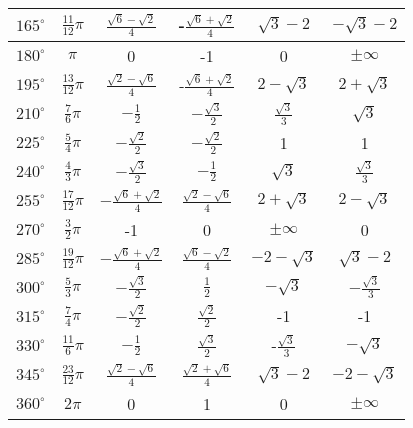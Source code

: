 \begin{tabular}{  | c | c || c | c | c | c | }
  	\hline	
    $165^{\circ}$     & $\frac{11}{12}\pi$   & $\frac{\sqrt{6}-\sqrt{2}}{4}$       &  -$\frac{\sqrt{6}+\sqrt{2}}{4}$     & $\sqrt{3}-2$   & $-\sqrt{3}-2$       \\
    \hline
    $180^{\circ}$     & $\pi$     & 0   &   -1   &  0    &  $\pm\infty$  \\
    \hline
	$195^{\circ}$     & $\frac{13}{12}\pi$   & $\frac{\sqrt{2}-\sqrt{6}}{4}$       &  -$\frac{\sqrt{6}+\sqrt{2}}{4}$     & $2-\sqrt{3}$   & $2+\sqrt{3}$       \\
	\hline
	$210^{\circ}$     & $\frac{7}{6}\pi$     & $-\frac{1}{2}$      &   $-\frac{\sqrt{3}}{2}$     &  $\frac{\sqrt{3}}{3}$    &  $\sqrt{3}$  \\
	\hline
  	$225^{\circ}$     & $\frac{5}{4}\pi$     & $-\frac{\sqrt{2}}{2}$      &   $-\frac{\sqrt{2}}{2}$     &  1    &  1  \\
  	\hline	
  	$240^{\circ}$     & $\frac{4}{3}\pi$     & $-\frac{\sqrt{3}}{2}$      &   $-\frac{1}{2}$     &  $\sqrt{3}$    &  $\frac{\sqrt{3}}{3}$  \\
  	\hline
     $255^{\circ}$     & $\frac{17}{12}\pi$   & $-\frac{\sqrt{6}+\sqrt{2}}{4}$       &  $\frac{\sqrt{2}-\sqrt{6}}{4}$     & $2+\sqrt{3}$   & $2-\sqrt{3}$       \\
     \hline
     $270^{\circ}$     & $\frac{3}{2}\pi$     & -1      &   0    &  $\pm\infty$    &  0  \\
     \hline	
    $285^{\circ}$     & $\frac{19}{12}\pi$   & $-\frac{\sqrt{6}+\sqrt{2}}{4}$       &  $\frac{\sqrt{6}-\sqrt{2}}{4}$     & $-2-\sqrt{3}$   & $\sqrt{3}-2$       \\
    \hline
    $300^{\circ}$     & $\frac{5}{3}\pi$     & $-\frac{\sqrt{3}}{2}$      &   $\frac{1}{2}$     &  $-\sqrt{3}$    &  $-\frac{\sqrt{3}}{3}$  \\
    \hline	
    $315^{\circ}$     & $\frac{7}{4}\pi$     & $-\frac{\sqrt{2}}{2}$      &   $\frac{\sqrt{2}}{2}$     &  -1   &  -1  \\
    \hline	
    $330^{\circ}$     & $\frac{11}{6}\pi$     & $-\frac{1}{2}$      &   $\frac{\sqrt{3}}{2}$     &  -$\frac{\sqrt{3}}{3}$   &  $-\sqrt{3}$  \\
    \hline	
     $345^{\circ}$     & $\frac{23}{12}\pi$     & $\frac{\sqrt{2}-\sqrt{6}}{4}$       &  $\frac{\sqrt{2}+\sqrt{6}}{4}$    &  $\sqrt{3}-2$    &  $-2-\sqrt{3}$  \\
     \hline	
     $360^{\circ}$     & $2\pi$   & 0       &  1     & 0   & $\pm\infty$       \\
     \hline
\end{tabular}
